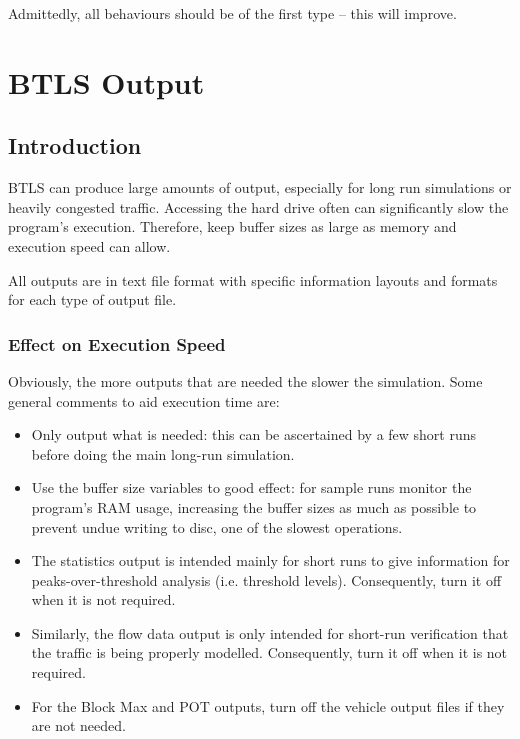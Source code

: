 \documentclass[
]{article}
\begin{document}
Admittedly, all behaviours should be of the first type -- this will
improve.

\section{BTLS Output}\label{btls-output}

\subsection{Introduction}\label{introduction-3}

BTLS can produce large amounts of output, especially for long run
simulations or heavily congested traffic. Accessing the hard drive often
can significantly slow the program's execution. Therefore, keep buffer
sizes as large as memory and execution speed can allow.

All outputs are in text file format with specific information layouts
and formats for each type of output file.

\subsubsection*{Effect on Execution
Speed}\label{effect-on-execution-speed}

Obviously, the more outputs that are needed the slower the simulation.
Some general comments to aid execution time are:

\begin{itemize}
\item
  Only output what is needed: this can be ascertained by a few short
  runs before doing the main long-run simulation.
\item
  Use the buffer size variables to good effect: for sample runs monitor
  the program's RAM usage, increasing the buffer sizes as much as
  possible to prevent undue writing to disc, one of the slowest
  operations.
\item
  The statistics output is intended mainly for short runs to give
  information for peaks-over-threshold analysis (i.e. threshold levels).
  Consequently, turn it off when it is not required.
\item
  Similarly, the flow data output is only intended for short-run
  verification that the traffic is being properly modelled.
  Consequently, turn it off when it is not required.
\item
  For the Block Max and POT outputs, turn off the vehicle output files
  if they are not needed.
\end{itemize}
\end{document}
